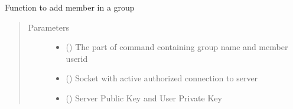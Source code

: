\documentclass[letterpaper,10pt,english]{sphinxmanual}
\begin{document}
\begin{fulllineitems}
\label{\detokenize{userInputHandler:userInputHandler.removeMemberFromGroup}}
Function to add member in a group
\begin{quote}\begin{description}
\item[{Parameters}] \leavevmode\begin{itemize}
\item {} 
 () \textendash{} The part of command containing group name and member userid

\item {} 
 () \textendash{} Socket with active authorized connection to server

\item {} 
 () \textendash{} Server Public Key and User Private Key

\end{itemize}

\end{description}\end{quote}

\end{fulllineitems}

\end{document}
